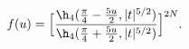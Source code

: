 \begin{equation}
f(u) = \Bigl[\frac{\h_4(\frac{\pi}{4}-\frac{5u}{2},|t|^{5/2})}
{\h_4(\frac{\pi}{4}+\frac{5u}{2},|t|^{5/2})}\Bigr]^{2N}.
\end{equation}

